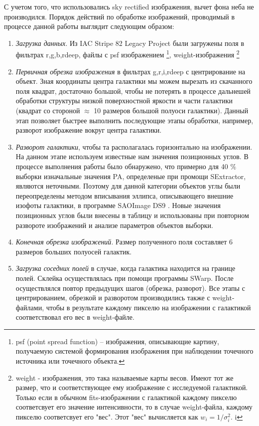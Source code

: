 С учетом того, что использовались sky rectified изображения, вычет фона неба не производился. Порядок действий по обработке изображений, проводимый в процессе данной работы выглядит следующим образом:
\begin{enumerate}
    \item \textit{Загрузка данных}. Из IAC Stripe 82 Legacy Project были загружены поля в фильтрах r,g,b,rdeep, файлы с psf изображением \footnote{psf (point spread function) -- изображения, описывающие картину, получаемую системой формирования изображения при наблюдении точечного источника или точечного объекта.}, weight-изображения \footnote{weight - изображения, это така называемые карты весов. Имеют тот же размер, что и соответствующее ему изображение с исследуемой галактикой. Только если в обычном fits-изображении с галактикой каждому пикселю соответсвует его значение интенсивности, то в случае weight-файла, каждому пикселю соответсвует его "вес". Этот "вес" вычисляется как $w_i = 1/\sigma_i^2.$
i }
    \item \textit{Первичная обрезка изображения} в фильтрах g,r,i,rdeep с центрирование на объект. Зная координаты центра галактики мы можем вырезать из скачанного поля квадрат, достаточно большой, чтобы не потерять в процессе дальнешей обработки структуры низкой поверхностной яркости и части галактики (квадрат со стороной $\approx$ 10 размеров большой полуоси галактики). Данный этап позволяет быстрее выполнить последующие этапы обработки, например, разворот изображение вокруг центра галактики.
    \item \textit{Разворот галактики}, чтобы та располагалась горизонтально на изображении. На данном этапе используем известные нам значения позиционных углов. В процессе выполнения работы было обнаружено, что примерно для 40 $\%$ выборки изначальные значения PA, определеные при промощи SExtractor, являются неточными. Поэтому для данной категории объектов углы были переопределены методом вписывания эллипса, описывающего внешние изофоты галактики, в программе SAOImage DS9 \cite{2003ASPC..295..489J}. Новые значения позиционных углов были внесены в таблицу и использованы при повторном развороте изображений и анализе параметров объектов выборки.
    \item \textit{Конечная обрезка изображений}. Размер полученного поля составляет 6 размеров больших полуосей галактик. 
    \item \textit{Загрузка соседних полей} в случае, когда галактика находится на границе полей. Склейка осуществлялась при помощи программы SWarp. После осуществлялся повтор предыдущих шагов (обрезка, разворот). Все этапы с центрированием, обрезкой и разворотом производились также с weight-файлами, чтобы в результате каждому пикселю на изображении с галактикой соответствовал его вес в weight-файле.

\end{enumerate}
